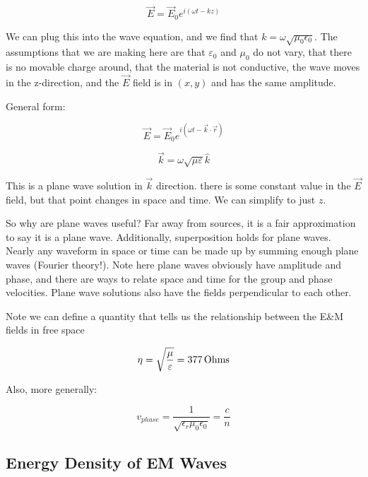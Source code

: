 \documentclass{article}
\newcommand{\unit}[1]{{\,\rm #1}}
\begin{document}
\begin{equation}
    \boxed{\vec{E} = \vec{E}_0 e^{i(\omega t - kz)}}
\end{equation}

We can plug this into the wave equation, and we find that $\boxed{k = \omega \sqrt{\mu_0 \epsilon_0}}$. The assumptions that we are making here are that $\varepsilon_0$ and $\mu_0$ do not vary, that there is no movable charge around, that the material is not conductive, the wave moves in the z-direction, and the $\vec{E}$ field is in $(x,y)$ and has the same amplitude.

General form:

\begin{equation}
    \vec{E} = \vec{E}_0 e^{i(\omega t - \vec{k} \cdot \vec{r})}
\end{equation}

\begin{equation}
    \vec{k} = \omega \sqrt{\mu \varepsilon} \hat{k}
\end{equation}

This is a plane wave solution in $\vec{k}$ direction. there is some constant value in the $\vec{E}$ field, but that point changes in space and time. We can simplify to just $z$.

So why are plane waves useful? Far away from sources, it is a fair approximation to say it is a plane wave. Additionally, superposition holds for plane waves. Nearly any waveform in space or time can be made up by summing enough plane waves (Fourier theory!). Note here plane waves obviously have amplitude and phase, and there are ways to relate space and time for the group and phase velocities. Plane wave solutions also have the fields perpendicular to each other.

Note we can define a quantity that tells us the relationship between the E\&M fields in free space

\begin{equation}
    \eta = \sqrt{\frac{\mu}{\varepsilon}} = 377 \unit{ Ohms}
\end{equation}

Also, more generally:

\begin{equation}
    v_{phase} = \frac{1}{\sqrt{\epsilon_r \mu_0 \epsilon_0}} = \frac{c}{n}
\end{equation}

\subsection{Energy Density of EM Waves}
\end{document}

